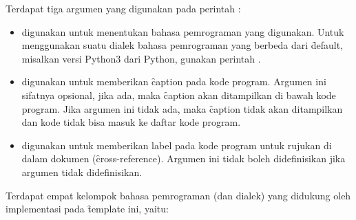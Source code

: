 Terdapat tiga argumen yang digunakan pada perintah :
\begin{itemize}
	\item {} digunakan untuk menentukan bahasa pemrograman yang digunakan.
	Untuk menggunakan suatu dialek bahasa pemrograman yang berbeda dari \f{default},
	misalkan versi Python3 dari Python,
	gunakan perintah .
	\item {} digunakan untuk memberikan \f{caption} pada kode program.
	Argumen ini sifatnya opsional, jika ada, maka \f{caption} akan ditampilkan di bawah kode program.
	Jika argumen ini tidak ada, maka \f{caption} tidak akan ditampilkan dan kode tidak bisa masuk ke daftar kode program.
	\item {} digunakan untuk memberikan label pada kode program untuk rujukan di dalam dokumen (\f{cross-reference}).
	Argumen ini tidak boleh didefinisikan jika argumen  tidak didefinisikan.
\end{itemize}

Terdapat empat kelompok bahasa pemrograman (dan dialek) yang didukung oleh implementasi  pada \f{template} ini, yaitu:

